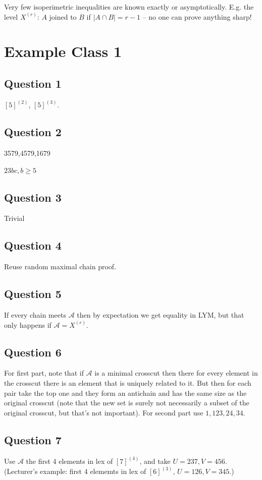 \documentclass[a4paper]{article}
\begin{document}
Very few isoperimetric inequalities are known exactly or asymptotically. E.g. the level $X^{(r)}$: $A$ joined to $B$ if $|A \cap B| = r-1$ -- no one can prove anything sharp!




\newpage

\section{Example Class 1}

\subsection{Question 1}
$[5]^{(2)}$, $[5]^{(3)}$.

\subsection{Question 2}
3579,4579,1679

$23bc, b \geq 5$

\subsection{Question 3}
Trivial

\subsection{Question 4}
Reuse random maximal chain proof.

\subsection{Question 5}
If every chain meets $\mathcal{A}$ then by expectation we get equality in LYM, but that only happens if $\mathcal{A} = X^{(r)}$.

\subsection{Question 6}
For first part, note that if $\mathcal{A}$ is a minimal crosscut then there for every element in the crosscut there is an element that is uniquely related to it. But then for each pair take the top one and they form an antichain and has the same size as the original crosscut (note that the new set is surely not necessarily a subset of the original crosscut, but that's not important).
For second part use $1,123,24,34$.

\subsection{Question 7}
Use $\mathcal{A}$ the first 4 elements in lex of $[7]^{(4)}$, and take $U=237, V=456$.\\
(Lecturer's example: first 4 elememts in lex of $[6]^{(3)}$, $U=126, V=345$.)
\end{document}
